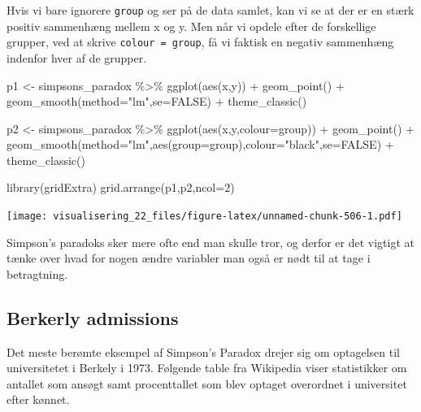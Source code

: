 \documentclass[
]{book}
\newenvironment{Shaded}{\begin{snugshade}}{\end{snugshade}}
\newcommand{\AttributeTok}[1]{\textcolor[rgb]{0.77,0.63,0.00}{#1}}
\newcommand{\ConstantTok}[1]{\textcolor[rgb]{0.00,0.00,0.00}{#1}}
\newcommand{\DecValTok}[1]{\textcolor[rgb]{0.00,0.00,0.81}{#1}}
\newcommand{\FunctionTok}[1]{\textcolor[rgb]{0.00,0.00,0.00}{#1}}
\newcommand{\NormalTok}[1]{#1}
\newcommand{\OtherTok}[1]{\textcolor[rgb]{0.56,0.35,0.01}{#1}}
\newcommand{\SpecialCharTok}[1]{\textcolor[rgb]{0.00,0.00,0.00}{#1}}
\newcommand{\StringTok}[1]{\textcolor[rgb]{0.31,0.60,0.02}{#1}}
\begin{document}
Hvis vi bare ignorere \texttt{group} og ser på de data samlet, kan vi se at der er en stærk positiv sammenhæng mellem x og y. Men når vi opdele efter de forskellige grupper, ved at skrive \texttt{colour\ =\ group}, få vi faktisk en negativ sammenhæng indenfor hver af de grupper.

\begin{Shaded}
\begin{Highlighting}[]
\NormalTok{p1 }\OtherTok{\textless{}{-}}\NormalTok{ simpsons\_paradox }\SpecialCharTok{\%\textgreater{}\%} 
  \FunctionTok{ggplot}\NormalTok{(}\FunctionTok{aes}\NormalTok{(x,y)) }\SpecialCharTok{+} 
  \FunctionTok{geom\_point}\NormalTok{() }\SpecialCharTok{+}
  \FunctionTok{geom\_smooth}\NormalTok{(}\AttributeTok{method=}\StringTok{"lm"}\NormalTok{,}\AttributeTok{se=}\ConstantTok{FALSE}\NormalTok{) }\SpecialCharTok{+}
  \FunctionTok{theme\_classic}\NormalTok{()}

\NormalTok{p2 }\OtherTok{\textless{}{-}}\NormalTok{ simpsons\_paradox }\SpecialCharTok{\%\textgreater{}\%} 
  \FunctionTok{ggplot}\NormalTok{(}\FunctionTok{aes}\NormalTok{(x,y,}\AttributeTok{colour=}\NormalTok{group)) }\SpecialCharTok{+} 
  \FunctionTok{geom\_point}\NormalTok{() }\SpecialCharTok{+}
  \FunctionTok{geom\_smooth}\NormalTok{(}\AttributeTok{method=}\StringTok{"lm"}\NormalTok{,}\FunctionTok{aes}\NormalTok{(}\AttributeTok{group=}\NormalTok{group),}\AttributeTok{colour=}\StringTok{"black"}\NormalTok{,}\AttributeTok{se=}\ConstantTok{FALSE}\NormalTok{) }\SpecialCharTok{+}
  \FunctionTok{theme\_classic}\NormalTok{()}

\FunctionTok{library}\NormalTok{(gridExtra)}
\FunctionTok{grid.arrange}\NormalTok{(p1,p2,}\AttributeTok{ncol=}\DecValTok{2}\NormalTok{)}
\end{Highlighting}
\end{Shaded}

\texttt{[image: visualisering\_22\_files/figure-latex/unnamed-chunk-506-1.pdf]}

Simpson's paradoks sker mere ofte end man skulle tror, og derfor er det vigtigt at tænke over hvad for nogen ændre variabler man også er nødt til at tage i betragtning.

\hypertarget{berkerly-admissions}{%
\subsection{Berkerly admissions}\label{berkerly-admissions}}

Det meste berømte eksempel af Simpson's Paradox drejer sig om optagelsen til universitetet i Berkely i 1973. Følgende table fra Wikipedia viser statistikker om antallet som ansøgt samt procenttallet som blev optaget overordnet i universitet efter kønnet.
\end{document}
